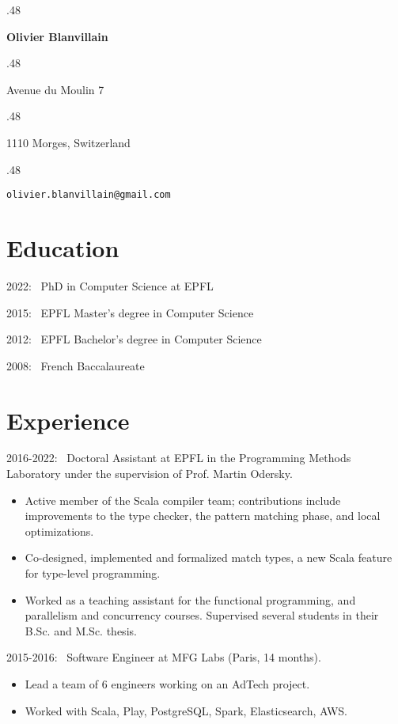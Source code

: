 \documentclass[marginmode, 11pt]{res}
\newcommand{\centered}[1]{\moveleft.48\hoffset\centerline{#1}}
\renewcommand{\:}[0]{:~}
\begin{document}
\centered{\LARGE\textbf{Olivier Blanvillain}}
\vspace{10pt}

\centered{Avenue du Moulin 7}
\centered{1110 Morges, Switzerland}
\vspace{3pt}
\vspace{2pt}
\centered{\texttt{olivier.blanvillain@gmail.com}}

\begin{resume}

\section{Education}

2022\: PhD in Computer Science at EPFL

2015\: EPFL Master's degree in Computer Science

2012\: EPFL Bachelor's degree in Computer Science

2008\: French Baccalaureate

\section{Experience}

2016-2022\: Doctoral Assistant at EPFL in the Programming Methods Laboratory under the supervision of Prof. Martin Odersky.

\begin{itemize}
  \item Active member of the Scala compiler team; contributions include improvements to the type checker, the pattern matching phase, and local optimizations.
  \item Co-designed, implemented and formalized match types, a new Scala feature for type-level programming.
  \item Worked as a teaching assistant for the functional programming, and parallelism and concurrency courses. Supervised several students in their B.Sc. and M.Sc. thesis.
\end{itemize}

2015-2016\: Software Engineer at MFG Labs (Paris, 14 months).

\begin{itemize}
  \item Lead a team of 6 engineers working on an AdTech project.
  \item Worked with Scala, Play, PostgreSQL, Spark, Elasticsearch, AWS.
\end{itemize}


\end{resume}
\end{document}
